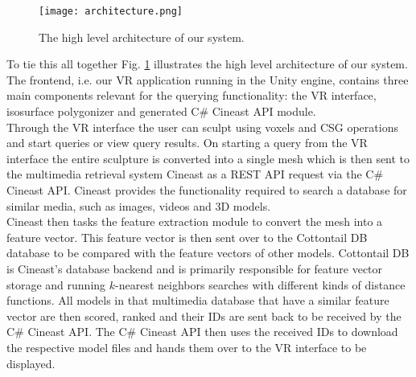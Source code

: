 \begin{figure}
\centering
\captionsetup{width=0.8\textwidth}
\texttt{[image: architecture.png]}
\caption{The high level architecture of our system.}
\label{fig:architecture}
\end{figure}

To tie this all together Fig. \ref{fig:architecture} illustrates the high level architecture of our system. The frontend, i.e. our VR application running in the Unity
engine, contains three main components relevant for the querying functionality: the VR interface, isosurface polygonizer and generated C\# Cineast API module.\\
Through the VR interface the user can sculpt using voxels and CSG operations and start queries or view query results. On starting a query from the VR interface the entire sculpture is converted into a single mesh which is then sent to the multimedia retrieval system Cineast as a REST API request via the C\# Cineast API. Cineast provides the functionality required to search a database for similar media, such as images, videos and 3D models.\\
Cineast then tasks the feature extraction module to convert the mesh into a feature vector. This feature vector is then sent over to the Cottontail DB database to be
compared with the feature vectors of other models. Cottontail DB is Cineast's database backend and is primarily responsible for feature vector storage and running $k$-nearest neighbors searches with different kinds of distance functions. All models in that multimedia database that have a similar feature vector are then scored, ranked and their IDs are sent back to be received by the C\# Cineast API. The C\# Cineast API then uses the received IDs to download the respective model files and hands them over to the VR interface to be displayed.

